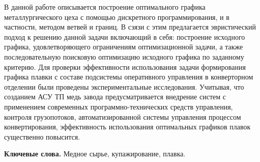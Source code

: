 В данной работе описывается построение оптимального графика
металлургического цеха с помощью дискретного программирования, и в
частности, методом ветвей и границ. В сзязи с этим предлагается
эвристический подход к решению данной задачи включающий в себя:
построение исходного графика, удовлетворяющего ограничениям
оптимизационной задачи, а также последовательную поисковую оптимизацию
исходного графика по заданному критерию. Для проверки эффективности
использования задачи формирования графика плавки с составе подсистемы
оперативного управления в конверторном отделении были проведены
экспериментальные исследования. Учитывая, что созданием АСУ ТП медь
завода предусматривается внедрение систем с применением современных
программно-технических средств управления, контроля грузопотоков,
автоматизированной системы управления процессом конвертирования,
эффективность использования оптимальных графиков плавок существенно
повысится.

{\bfseries Ключевые слова.} Медное сырье, купажирование, плавка.

